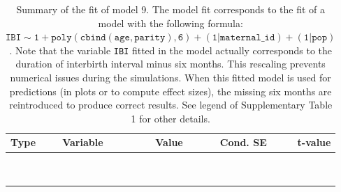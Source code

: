 \begin{table}[H]

\caption{\label{tab:tab9}Summary of the fit of model 9. The model fit corresponds to the fit of a model with the following formula: {\small$\mathtt{IBI \sim 1 + poly(cbind(age, parity), 6) + (1 | maternal\_id) + (1 | pop)}$}. Note that the variable \texttt{IBI} fitted in the model actually corresponds to the duration of interbirth interval minus six months. This rescaling prevents numerical issues during the simulations. When this fitted model is used for predictions (in plots or to compute effect sizes), the missing six months are reintroduced to produce correct results. See legend of Supplementary Table 1 for other details.}
\centering
\fontsize{8}{10}\selectfont
\begin{tabular}[t]{>{\raggedright\arraybackslash}p{3cm}>{\raggedright\arraybackslash}p{5cm}rrr}
\toprule
Type & Variable & Value & Cond. SE & t-value\\
\midrule
\cellcolor{gray!6}{fixed effects} & \cellcolor{gray!6}{$\beta_1$} & \cellcolor{gray!6}{3.44} & \cellcolor{gray!6}{0.0578} & \cellcolor{gray!6}{59.6}\\
\cellcolor{gray!6}{} & \cellcolor{gray!6}{$\beta_{\mathtt{age}}$} & \cellcolor{gray!6}{-63.4} & \cellcolor{gray!6}{21.9} & \cellcolor{gray!6}{-2.9}\\
\cellcolor{gray!6}{} & \cellcolor{gray!6}{$\beta_{\mathtt{age}^2}$} & \cellcolor{gray!6}{39.5} & \cellcolor{gray!6}{19.6} & \cellcolor{gray!6}{2.01}\\
\cellcolor{gray!6}{} & \cellcolor{gray!6}{$\beta_{\mathtt{age}^3}$} & \cellcolor{gray!6}{-31.2} & \cellcolor{gray!6}{13} & \cellcolor{gray!6}{-2.4}\\
\cellcolor{gray!6}{} & \cellcolor{gray!6}{$\beta_{\mathtt{age}^4}$} & \cellcolor{gray!6}{14.9} & \cellcolor{gray!6}{6.31} & \cellcolor{gray!6}{2.37}\\
\cellcolor{gray!6}{} & \cellcolor{gray!6}{$\beta_{\mathtt{age}^5}$} & \cellcolor{gray!6}{-4.98} & \cellcolor{gray!6}{2.42} & \cellcolor{gray!6}{-2.06}\\
\cellcolor{gray!6}{} & \cellcolor{gray!6}{$\beta_{\mathtt{age}^6}$} & \cellcolor{gray!6}{4.01} & \cellcolor{gray!6}{1.01} & \cellcolor{gray!6}{3.95}\\
\cellcolor{gray!6}{} & \cellcolor{gray!6}{$\beta_{\mathtt{parity}}$} & \cellcolor{gray!6}{120} & \cellcolor{gray!6}{40.7} & \cellcolor{gray!6}{2.96}\\
\cellcolor{gray!6}{} & \cellcolor{gray!6}{$\beta_{\mathtt{age}\times\mathtt{parity}}$} & \cellcolor{gray!6}{-29655} & \cellcolor{gray!6}{15604} & \cellcolor{gray!6}{-1.9}\\

\end{tabular}
\end{table}

